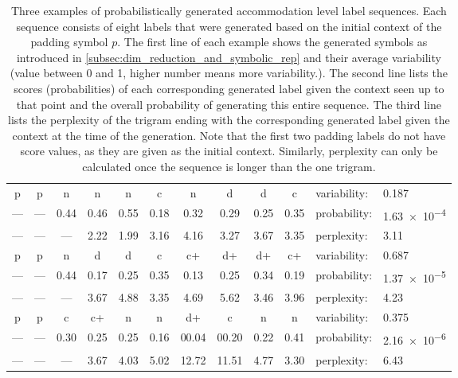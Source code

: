 \begin{table}[t]
	\centering
	\caption[Examples of probabilistically generated accommodation level label sequences]
		{Three examples of probabilistically generated accommodation level label sequences.
		 Each sequence consists of eight labels that were generated based on the initial context of the padding symbol $p$.
		 The first line of each example shows the generated symbols as introduced in \cref{subsec:dim_reduction_and_symbolic_rep} and their average variability (value between 0 and 1, higher number means more variability.).
		 The second line lists the scores (probabilities) of each corresponding generated label given the context seen up to that point and the overall probability of generating this entire sequence.
		 The third line lists the perplexity of the trigram ending with the corresponding generated label given the context at the time of the generation.
		 Note that the first two padding labels do not have score values, as they are given as the initial context.
		 Similarly, perplexity can only be calculated once the sequence is longer than the one trigram.}
	\label{tab:generated_symbol_sequences}
	\begin{tabularx}{\linewidth}{*{10}{c}l@{\hskip 0.1cm}l}
		\toprule
		p    & p    & n    & n    & n    & c    & n    & d    & d    & c    & variability: & \num{0.187}  \\
		---  & ---  & 0.44 & 0.46 & 0.55 & 0.18 & 0.32 & 0.29 & 0.25 & 0.35 & probability: & \num{1.63e-4}\\
		---  & ---  & ---  & 2.22 & 1.99 & 3.16 & 4.16 & 3.27 & 3.67 & 3.35 & perplexity: & \num{3.11}   \\[0.4cm]
		
		p    & p    & n    & d    & d    & c    & c+   & d+   & d+   & c+   & variability: & \num{0.687}  \\
		---  & ---  & 0.44 & 0.17 & 0.25 & 0.35 & 0.13 & 0.25 & 0.34 & 0.19 & probability: & \num{1.37e-5}\\
		---  & ---  & ---  & 3.67 & 4.88 & 3.35 & 4.69 & 5.62 & 3.46 & 3.96 & perplexity: & \num{4.23}   \\[0.4cm]
		
		p    & p    & c    & c+   & n    & n    & d+    & c     & n    & n    & variability: & \num{0.375}  \\
		---  & ---  & 0.30 & 0.25 & 0.25 & 0.16 & 00.04 & 00.20 & 0.22 & 0.41 & probability: & \num{2.16e-6}\\
		---  & ---  & ---  & 3.67 & 4.03 & 5.02 & 12.72 & 11.51 & 4.77 & 3.30 & perplexity: & \num{6.43}   \\
		\bottomrule
	\end{tabularx}
\end{table}

